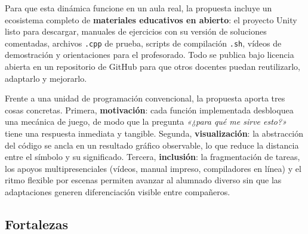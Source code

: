 \documentclass[a4paper,12pt]{article}
\begin{document}
Para que esta dinámica funcione en un aula real, la propuesta incluye un ecosistema completo de \textbf{materiales educativos en abierto}: el proyecto Unity listo para descargar, manuales de ejercicios con su versión de soluciones comentadas, archivos \texttt{.cpp} de prueba, scripts de compilación \texttt{.sh}, vídeos de demostración y orientaciones para el profesorado. Todo se publica bajo licencia abierta en un repositorio de GitHub para que otros docentes puedan reutilizarlo, adaptarlo y mejorarlo.

Frente a una unidad de programación convencional, la propuesta aporta tres cosas concretas. Primera, \textbf{motivación}: cada función implementada desbloquea una mecánica de juego, de modo que la pregunta \textit{«¿para qué me sirve esto?»} tiene una respuesta inmediata y tangible. Segunda, \textbf{visualización}: la abstracción del código se ancla en un resultado gráfico observable, lo que reduce la distancia entre el símbolo y su significado. Tercera, \textbf{inclusión}: la fragmentación de tareas, los apoyos multipresenciales (vídeos, manual impreso, compiladores en línea) y el ritmo flexible por escenas permiten avanzar al alumnado diverso sin que las adaptaciones generen diferenciación visible entre compañeros.


\subsection{Fortalezas}
\end{document}
